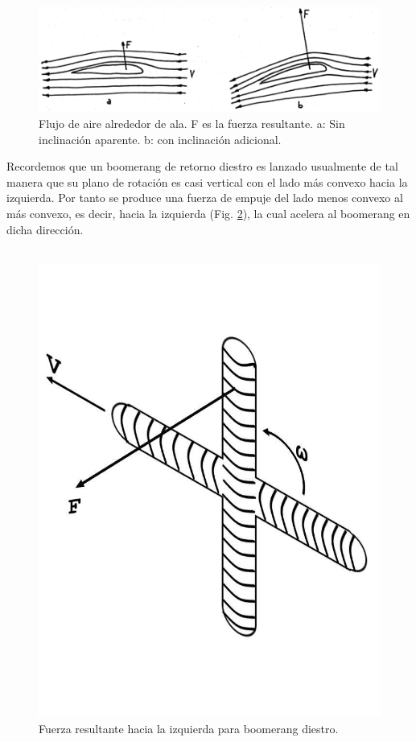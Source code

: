 		\begin{figure}[ht]
		\begin{center}
		\includegraphics[scale=0.3]{imagenes/3-boomerang/airFlow.png}
		\caption{Flujo de aire alrededor de ala. F es la fuerza resultante. a: Sin inclinación aparente. b: con inclinación adicional.}
		\label{fig3}
		\end{center}
		\end{figure}
\newpage
    Recordemos que un boomerang de retorno diestro es lanzado usualmente de tal manera que su plano de rotación es casi vertical con el lado más convexo hacia la izquierda. Por tanto se produce una fuerza de empuje del lado menos convexo al más convexo, es decir, hacia la izquierda (Fig. \ref{fig4}), la cual acelera al boomerang en dicha dirección.\\\\

		\begin{figure}[ht]
		\begin{center}
		\includegraphics[scale=0.25]{imagenes/3-boomerang/leftwardForce.png}
		\caption{Fuerza resultante hacia la izquierda para boomerang diestro.}
		\label{fig4}
		\end{center}
		\end{figure}

